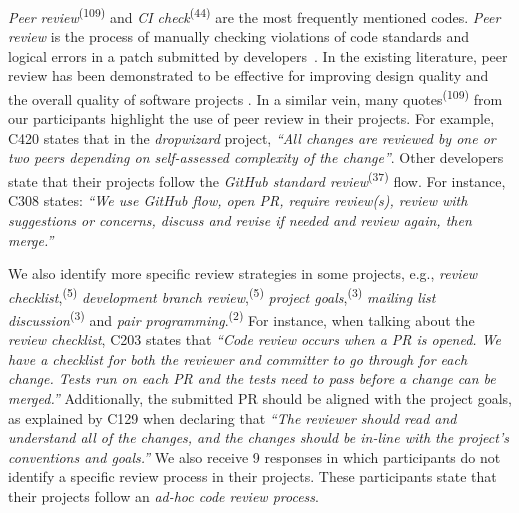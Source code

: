 	\textit{Peer review}\textsuperscript{(109)} and \textit{CI check}\textsuperscript{(44)} are the most frequently mentioned codes. 
	\textit{Peer review} is the process of manually checking violations of code standards and logical errors in a patch submitted by developers~\citep{rahman2017impact}. In the existing literature, peer review has been demonstrated to be effective for improving design quality and the overall quality of software projects \citep{rahman2017impact}. 
	In a similar vein, many quotes\textsuperscript{(109)} from our participants highlight the use of peer review in their projects. For example, C420 states that in the \textit{dropwizard} project, \textit{``All changes are reviewed by one or two peers depending on self-assessed complexity of the change''}.
	Other developers state that their projects follow the \textit{GitHub standard review}\textsuperscript{(37)} flow. For instance, C308 states: \textit{``We use GitHub flow, open PR, require review(s), review with suggestions or concerns, discuss and revise if needed and review again, then merge.''} 

	We also identify more specific review strategies in some projects, e.g., \textit{review checklist},\textsuperscript{(5)} \textit{development branch review},\textsuperscript{(5)} \textit{project goals},\textsuperscript{(3)} \textit{mailing list discussion}\textsuperscript{(3)} and \textit{pair programming}.\textsuperscript{(2)} For instance, when talking about the \textit{review checklist}, C203 states that \textit{``Code review occurs when a PR is opened. We have a checklist for both the reviewer and committer to go through for each change. Tests run on each PR and the tests need to pass before a change can be merged.''} Additionally, the submitted PR should be aligned with the project goals, as explained by 
	C129 when declaring that \textit{``The reviewer should read and understand all of the changes, and the changes should be in-line with the project's conventions and goals.''}	We also receive 9 responses in which participants do not identify a specific review process in their projects. These participants state that their projects follow an \textit{ad-hoc code review process}.

